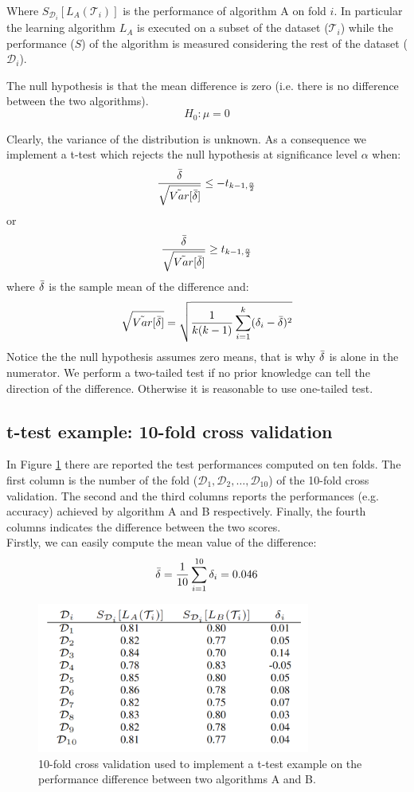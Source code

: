 Where $S_{\mathcal{D}_i}[L_A(\mathcal{T}_i)]$ is the performance of algorithm A on fold $i$. In particular the learning algorithm $L_A$ is executed on a subset of the dataset ($\mathcal{T}_i$) while the performance ($S$) of the algorithm is measured considering the rest of the dataset ($\mathcal{D}_i$). \newline

The null hypothesis is that the mean difference is zero (i.e. there is no difference between the two algorithms).
$$H_0 : \mu = 0$$

Clearly, the variance of the distribution is unknown. As a consequence we implement a t-test which rejects the null hypothesis at significance level $\alpha$ when:
$$\frac{\Bar{\delta}}{\sqrt{\tilde{Var}[\Bar{\delta}]}} \leq - t_{k-1, \frac{\alpha}{2}}$$
or
$$\frac{\Bar{\delta}}{\sqrt{\tilde{Var}[\Bar{\delta}]}} \geq t_{k-1, \frac{\alpha}{2}}$$
where $\Bar{\delta}$ is the sample mean of the difference and:
$$\sqrt{\tilde{Var}[\Bar{\delta}]} = \sqrt{\frac{1}{k(k-1)} \sum_{i=1}^k (\delta_i - \Bar{\delta})^2}$$
Notice the the null hypothesis assumes zero means, that is why $\Bar{\delta}$ is alone in the numerator. \newline
We perform a two-tailed test if no prior knowledge can tell the direction of the difference. Otherwise it is reasonable to use one-tailed test.
\subsection{t-test example: 10-fold cross validation}
In Figure \ref{fig:tTestExample} there are reported the test performances computed on ten folds. The first column is the number of the fold ($\mathcal{D}_1, \mathcal{D}_2, \hdots, \mathcal{D}_{10}$) of the 10-fold cross validation. The second and the third columns reports the performances (e.g. accuracy) achieved by algorithm A and B respectively. Finally, the fourth columns indicates the difference between the two scores.\\
Firstly, we can easily compute the mean value of the difference:
$$\Bar{\delta} = \frac{1}{10} \sum_{i=1}^{10} \delta_i = 0.046$$

\begin{figure}
    \centering
    \includegraphics[width=0.8\textwidth]{images/tTestExample.png}
    \caption{10-fold cross validation used to implement a t-test example on the performance difference between two algorithms A and B.}
    \label{fig:tTestExample}
\end{figure}

